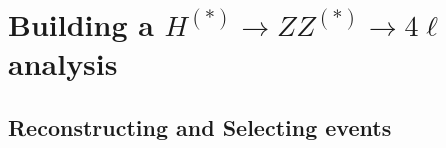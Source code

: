 

\section{Building a $H^{(*)} \to ZZ^{(*)} \to 4\ell$ analysis}

\subsection{Reconstructing and Selecting events}



